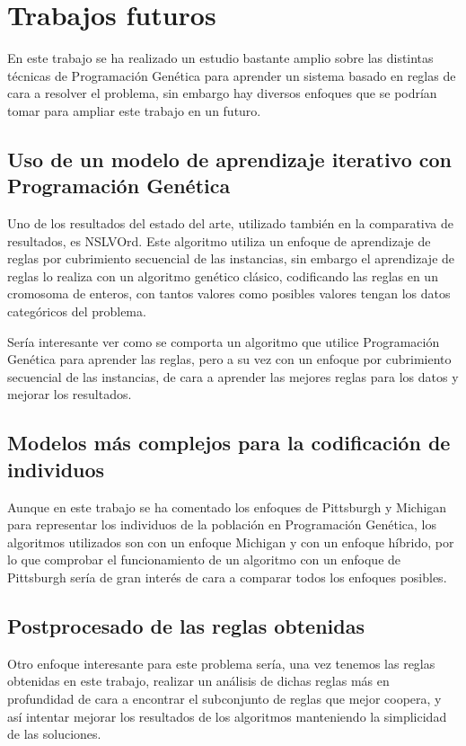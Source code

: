 \section{Trabajos futuros}

En este trabajo se ha realizado un estudio bastante amplio sobre las distintas técnicas de Programación Genética para aprender un sistema basado en reglas de cara a resolver el problema, sin embargo hay diversos enfoques que se podrían tomar para ampliar este trabajo en un futuro.

\subsection{Uso de un modelo de aprendizaje iterativo con Programación Genética}

Uno de los resultados del estado del arte, utilizado también en la comparativa de resultados, es NSLVOrd. Este algoritmo utiliza un enfoque de aprendizaje de reglas por cubrimiento secuencial de las instancias, sin embargo el aprendizaje de reglas lo realiza con un algoritmo genético clásico, codificando las reglas en un cromosoma de enteros, con tantos valores como posibles valores tengan los datos categóricos del problema.

Sería interesante ver como se comporta un algoritmo que utilice Programación Genética para aprender las reglas, pero a su vez con un enfoque por cubrimiento secuencial de las instancias, de cara a aprender las mejores reglas para los datos y mejorar los resultados.

\subsection{Modelos más complejos para la codificación de individuos}

Aunque en este trabajo se ha comentado los enfoques de Pittsburgh y Michigan para representar los individuos de la población en Programación Genética, los algoritmos utilizados son con un enfoque Michigan y con un enfoque híbrido, por lo que comprobar el funcionamiento de un algoritmo con un enfoque de Pittsburgh sería de gran interés de cara a comparar todos los enfoques posibles.


\subsection{Postprocesado de las reglas obtenidas}

Otro enfoque interesante para este problema sería, una vez tenemos las reglas obtenidas en este trabajo, realizar un análisis de dichas reglas más en profundidad de cara a encontrar el subconjunto de reglas que mejor coopera, y así intentar mejorar los resultados de los algoritmos manteniendo la simplicidad de las soluciones.
